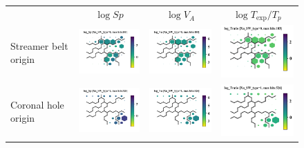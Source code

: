 \documentclass[utf8]{frontiersSCNS} %
\begin{document}
\begin{figure}[h!]
\begin{tabular}{m{2.5cm}CCC}
		& $\log Sp$ & $\log V_{A}$ & $\log T_{\text{exp}}/T_p$ \\
		Streamer belt origin & \includegraphics[width=4cm]{Roberts/SWtype-Xu_SW_type-0-log_Sp} &
		\includegraphics[width=4cm]{Roberts/SWtype-Xu_SW_type-0-log_Va} &
		\includegraphics[width=4cm]{Roberts/SWtype-Xu_SW_type-0-log_Tratio} \hfill	\\
		
		Coronal hole origin & \includegraphics[width=4cm]{Roberts/SWtype-Xu_SW_type-1-log_Sp} &
		\includegraphics[width=4cm]{Roberts/SWtype-Xu_SW_type-1-log_Va} &
		\includegraphics[width=4cm]{Roberts/SWtype-Xu_SW_type-1-log_Tratio} \hfill	\\
		

\end{tabular}
\end{figure}
\end{document}
